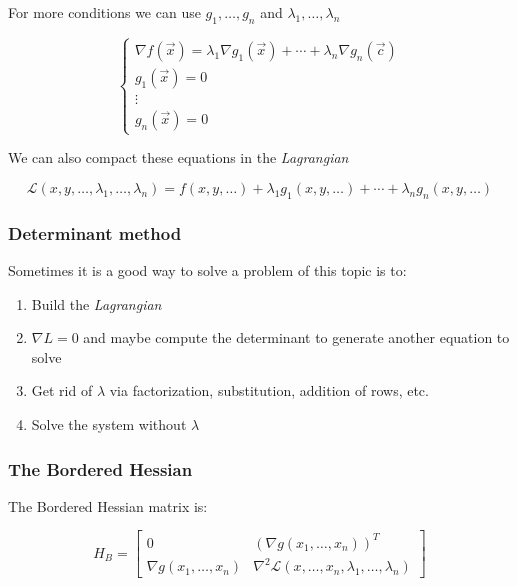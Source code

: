 For more conditions  we can use \(g_1, \dots, g_n\) and \(\lambda_1, \dots, \lambda_n\)

\[
    \begin{cases}
        \nabla f(\vec{x}) = \lambda_1 \nabla g_1(\vec{x}) + \cdots + \lambda_n \nabla g_n(\vec{c}) \\
        g_1(\vec{x}) = 0 \\
        \vdots \\
        g_n(\vec{x}) = 0
    \end{cases}
\]

We can also compact these equations in the \emph{Lagrangian}

\[
    \mathcal{L}(x,y, \dots, \lambda_1, \dots, \lambda_n) = f(x, y, \dots) + \lambda_1 g_1(x, y, \dots) + 
    \cdots + \lambda_n g_n(x, y, \dots)
\]

\subsubsection{Determinant method}

Sometimes it is a good way to solve a problem of this topic is to:

\begin{enumerate}
    
    \item Build the \emph{Lagrangian}
    
    \item \(\nabla L = 0\) and maybe compute the determinant to generate another equation to solve
        
    \item Get rid of \(\lambda\) via factorization, substitution, addition of rows, etc.
    
    \item Solve the system without \(\lambda\)

\end{enumerate}

\subsubsection{The Bordered Hessian}

The Bordered Hessian matrix is:

\[
    H_B =
    \begin{bmatrix}
    0 & {\left( \nabla g(x_1, \dots, x_n) \right)}^T \\
    \nabla g(x_1, \dots, x_n) & \nabla^2 \mathcal{L}(x, \dots, x_n, \lambda_1, \dots, \lambda_n)
    \end{bmatrix}
\]

